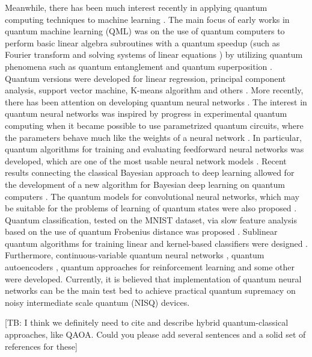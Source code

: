 \documentclass[pra,showkeys,twocolumn,showpacs]{revtex4-1}
\begin{document}
Meanwhile, there has been much interest recently in applying quantum computing techniques to machine learning \cite{dunjko2018, biamonte2017, schuld2014, carleo2019}. The main focus of early works in quantum machine learning (QML) was on the use of quantum computers to perform basic linear algebra subroutines with a quantum speedup (such as Fourier transform and solving systems of linear equations \cite{wiebe2012,harrow2009,childs2017}) by utilizing quantum phenomena such as quantum entanglement and quantum superposition \cite{biamonte2017, schuld2014}.  Quantum versions were developed for linear regression, principal component analysis, support vector machine, K-means algorithm and others \cite{lloyd2013,lloyd2014,dunjko2016,paparo2014,rebentrost2014}. More recently, there has been attention on developing quantum neural networks \cite{kamruzzaman2019, schuld2014b, jeswal2019}. The interest in quantum neural networks was inspired by progress in experimental quantum computing when it became possible to use parametrized quantum circuits, where the parameters behave much like the weights of a neural network \cite{lewenstein1994}. In particular, quantum algorithms for training and evaluating feedforward neural networks was developed, which are one of the most usable neural network models \cite{allcock2018, tacchino2019}. Recent results connecting the classical Bayesian approach to deep learning allowed for the development of a new algorithm for Bayesian deep learning on quantum computers \cite{zhao2019}. The quantum models for convolutional neural networks, which may be suitable for the problems of learning of quantum states were also proposed \cite{cong2019, liu2019}. Quantum classification, tested on the MNIST dataset, via slow feature analysis based on the use of quantum Frobenius distance was proposed \cite{kerenidis2018}. Sublinear quantum algorithms for training linear and kernel-based classifiers were designed \cite{li2019}. Furthermore, continuous-variable quantum neural networks \cite{killoran2019}, quantum autoencoders \cite{bondarenko2019}, quantum approaches for reinforcement learning \cite{dunjko2017, nautrup2019, foesel2018} and some other \cite{rebentrost2018, purushothaman1997, verdon2019, cherny2019, byrnes2013, mishra2019, vinci2019, lu2019} were developed. Currently, it is believed that implementation of quantum neural networks can be the main test bed to achieve practical quantum supremacy on noisy intermediate scale quantum (NISQ) devices.

[TB: I think we definitely need to cite and describe hybrid quantum-classical approaches, like QAOA.  Could you please add several sentences and a solid set of references for these]
\end{document}
